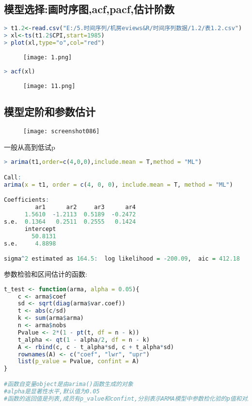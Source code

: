 \documentclass[11pt,a4paper,oneside]{book}
\begin{document}
\subsection{模型选择:画时序图,acf,pacf,估计阶数}
\begin{lstlisting}[language=r]
> t1.2<-read.csv("E:/5.时间序列/机房eviews&R/时间序列数据/1.2/表1.2.csv")
> xl<-ts(t1.2$CPI,start=1985)
> plot(xl,type="o",col="red")
\end{lstlisting}
\begin{figure}[H]
	\centering
	\texttt{[image: 1.png]}
\end{figure}
\begin{lstlisting}[language=r]
> acf(xl)
\end{lstlisting}
\begin{figure}[H]
	\centering
	\texttt{[image: 11.png]}
\end{figure}
\subsection{模型定阶和参数估计}
\begin{figure}[H]
	\centering
	\texttt{[image: screenshot086]}
	\label{fig:screenshot086}
\end{figure}
一般从高到低试p

\begin{lstlisting}[language=r]
> arima(t1,order=c(4,0,0),include.mean = T,method = "ML")

Call:
arima(x = t1, order = c(4, 0, 0), include.mean = T, method = "ML")

Coefficients:
         ar1      ar2     ar3      ar4
      1.5610  -1.2113  0.5189  -0.2472
s.e.  0.1364   0.2511  0.2555   0.1424
      intercept
        50.8131
s.e.     4.8898

sigma^2 estimated as 164.5:  log likelihood = -200.09,  aic = 412.18

\end{lstlisting}

参数检验和区间估计的函数:
\begin{lstlisting}[language=r]
t_test <- function(arma, alpha = 0.05){
	c <- arma$coef
	sd <- sqrt(diag(arma$var.coef)) 
	t <- abs(c/sd)
	k <- sum(arma$arma)
	n <- arma$nobs
	Pvalue <- 2*(1 - pt(t, df = n - k))
	t_alpha <- qt(1 - alpha/2, df = n - k)
	A <- rbind(c, c - t_alpha*sd, c + t_alpha*sd) 
	rownames(A) <- c("coef", "lwr", "upr")
	list(p_value = Pvalue, confint = A)
}

#函数自变量object是由arima()函数生成的对象
#alpha是显著性水平,默认值为0.05
#函数的返回值是列表,成员有p_value和confint,分别表示ARMA模型中参数检化验的p值和对应参数的置信区间.

\end{lstlisting}
\end{document}

